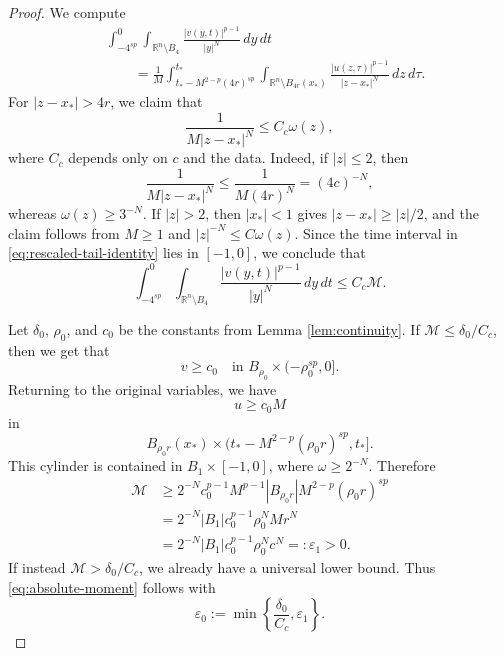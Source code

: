 \documentclass[10pt,a4paper]{amsart}
\newcommand{\R}{\mathbb R}
\begin{document}
\begin{proof}
We compute
\begin{equation}\label{eq:rescaled-tail-identity}
\begin{split}
&\int_{-4^{sp}}^0
\int_{\R^n\setminus B_4}
\frac{|v(y,t)|^{p-1}}{|y|^N}\,dy\,dt
\\
&\qquad=
\frac1M
\int_{t_*-M^{2-p}(4r)^{sp}}^{t_*}
\int_{\R^n\setminus B_{4r}(x_*)}
\frac{|u(z,\tau)|^{p-1}}{|z-x_*|^N}\,dz\,d\tau.
\end{split}
\end{equation}
For $|z-x_*|>4r$, we claim that
\begin{equation}\label{eq:kernel-weight-comparison}
\frac1{M|z-x_*|^N}
\le
C_c\omega(z),
\end{equation}
where $C_c$ depends only on $c$ and the data. Indeed, if $|z|\le2$, then
\[
\frac1{M|z-x_*|^N}
\le
\frac1{M(4r)^N}
=
(4c)^{-N},
\]
whereas $\omega(z)\ge3^{-N}$. If $|z|>2$, then $|x_*|<1$ gives
$|z-x_*|\ge|z|/2$, and the claim follows from $M\ge1$ and
$|z|^{-N}\le C\omega(z)$. Since the time interval in
\eqref{eq:rescaled-tail-identity} lies in $[-1,0]$, we conclude that
\begin{equation}\label{eq:rescaled-tail-moment-bound}
\int_{-4^{sp}}^0
\int_{\R^n\setminus B_4}
\frac{|v(y,t)|^{p-1}}{|y|^N}\,dy\,dt
\le
C_c\mathcal M.
\end{equation}

Let $\delta_0$, $\rho_0$, and $c_0$ be the constants from Lemma
\ref{lem:continuity}. If $\mathcal M\le\delta_0/C_c$, then we get
that
\[
v\ge c_0
\quad\text{in }
B_{\rho_0}\times(-\rho_0^{sp},0].
\]
Returning to the original variables, we have
\begin{equation}\label{eq:physical-positive-cylinder}
u\ge c_0M
\end{equation}
in
\[
B_{\rho_0r}(x_*)
\times
\bigl(t_*-M^{2-p}(\rho_0r)^{sp},t_*\bigr].
\]
This cylinder is contained in $B_1\times[-1,0]$, where
$\omega\ge2^{-N}$. Therefore
\begin{align*}
\mathcal M
&\ge
2^{-N}c_0^{p-1}M^{p-1}
|B_{\rho_0r}|
M^{2-p}(\rho_0r)^{sp}
\\
&=
2^{-N}|B_1|c_0^{p-1}\rho_0^N
Mr^N
\\
&=
2^{-N}|B_1|c_0^{p-1}\rho_0^Nc^N
=:
\varepsilon_1>0.
\end{align*}
If instead $\mathcal M>\delta_0/C_c$, we already have a universal lower
bound. Thus \eqref{eq:absolute-moment} follows with
\[
\varepsilon_0
:=
\min\left\{\frac{\delta_0}{C_c},\varepsilon_1\right\}.
\]
\end{proof}
\end{document}
